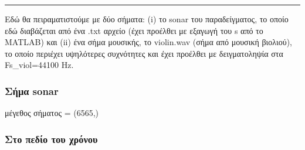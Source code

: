 \documentclass[letterpaper,10pt,english]{sphinxmanual}
\begin{document}
\bigskip\hrule\bigskip


\sphinxAtStartPar
Εδώ θα πειραματιστούμε με δύο σήματα: (i) το sonar του παραδείγματος, το οποίο εδώ διαβάζεται από ένα .txt αρχείο
(έχει προέλθει με εξαγωγή του s από το MATLAB) και (ii) ένα σήμα μουσικής, το violin.wav (σήμα από μουσική βιολιού),
το οποίο περιέχει υψηλότερες συχνότητες και έχει προέλθει με δειγματοληψία στα Fs\_viol=44100 Hz.


\subsubsection*{Σήμα sonar}
\label{\detokenize{Exercise2_1:sonar}}
\begin{sphinxVerbatim}[commandchars=\\\{\}]
   
      \PYG{p}{[}    \PYG{p}{]}
 
\end{sphinxVerbatim}

\begin{sphinxVerbatim}[commandchars=\\\{\}]
μέγεθος σήματος = (6565,)
\end{sphinxVerbatim}


\subsubsection*{Στο πεδίο του χρόνου}
\label{\detokenize{Exercise2_1:id2}}
\begin{sphinxVerbatim}[commandchars=\\\{\}]
   
 

\end{sphinxVerbatim}
\end{document}
